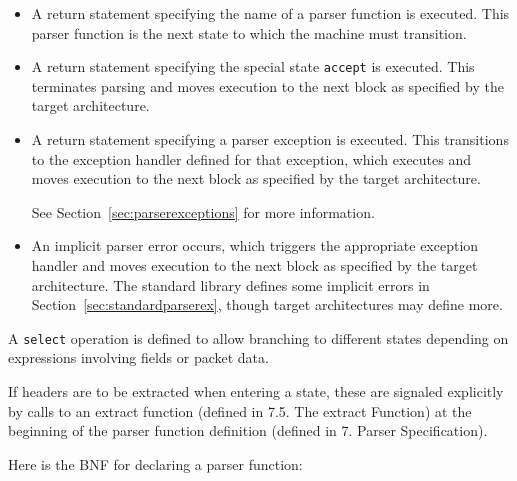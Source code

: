 \documentclass[12pt]{article}
\begin{document}
\begin{itemize}
\item
A return statement specifying the name of a parser function is executed. This
parser function is the next state to which the machine must transition.
\item
A return statement specifying the special state \texttt{accept} is executed.
This terminates parsing and moves execution to the next block as specified by
the target architecture.
\item
A return statement specifying a parser exception is executed. This transitions
to the exception handler defined for that exception, which executes and moves
execution to the next block as specified by the target architecture.

See Section~\ref{sec:parserexceptions} for more information.
\item
An implicit parser error occurs, which triggers the appropriate exception
handler and moves execution to the next block as specified by the target
architecture. The standard library defines some implicit errors in
Section~\ref{sec:standardparserex}, though target architectures may define more.
\end{itemize}

A \texttt{select} operation is defined to allow branching to different states
depending on expressions involving fields or packet data.

If headers are to be extracted when entering a state, these are signaled
explicitly by calls to an extract function (defined in 7.5. The extract
Function) at the beginning of the parser function definition (defined in 7.
Parser Specification).


Here is the BNF for declaring a parser function:
\end{document}
